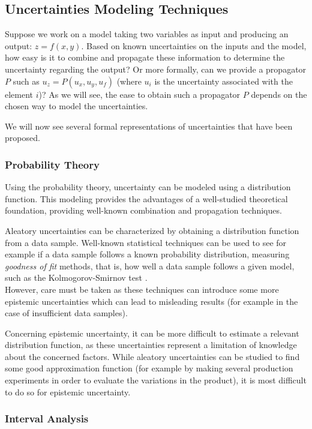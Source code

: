 \subsection{Uncertainties Modeling Techniques}

Suppose we work on a model taking two variables as input and producing an output: $z=f(x,y)$.
Based on known uncertainties on the inputs and the model, how easy is it to combine and propagate these information to determine the uncertainty regarding the output? Or more formally, can we provide a propagator $P$ such as $u_z = P(u_x, u_y, u_f)$ (where $u_i$ is the uncertainty associated with the element $i$)? As we will see, the ease to obtain such a propagator $P$ depends on the chosen way to model the uncertainties.

We will now see several formal representations of uncertainties that have been proposed.

\subsubsection{Probability Theory}

Using the probability theory, uncertainty can be modeled using a distribution function. This modeling provides the advantages of a well-studied theoretical foundation, providing well-known combination and propagation techniques.

Aleatory uncertainties can be characterized by obtaining a distribution function from a data sample. Well-known statistical techniques can be used to see for example if a data sample follows a known probability distribution, measuring \emph{goodness of fit} methods, that is, how well a data sample follows a given model, such as the Kolmogorov-Smirnov test \cite{Massey_1951}.\\
However, care must be taken as these techniques can introduce some more epistemic uncertainties which can lead to misleading results (for example in the case of insufficient data samples).

Concerning epistemic uncertainty, it can be more difficult to estimate a relevant distribution function, as these uncertainties represent a limitation of knowledge about the concerned factors. While aleatory uncertainties can be studied to find some good approximation function (for example by making several production experiments in order to evaluate the variations in the product), it is most difficult to do so for epistemic uncertainty.

\subsubsection{Interval Analysis}


